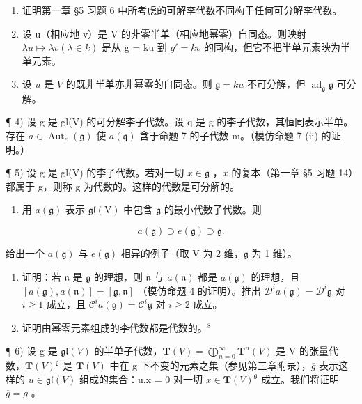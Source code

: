 
\begin{enumerate}
\def\labelenumi{\arabic{enumi})}
\item
  证明第一章 §5 习题 6 中所考虑的可解李代数不同构于任何可分解李代数。
\item
  设 u（相应地 v）是 V 的非零半单（相应地幂零）自同态。则映射 \(\lambda u \mapsto \lambda v (\lambda \in k)\) 是从 g = ku 到 \(g' = kv\) 的同构，但它不把半单元素映为半单元素。
\item
  设 \(u\) 是 \(V\) 的既非半单亦非幂零的自同态。则 \(\mathfrak{g} = ku\) 不可分解，但 \(\operatorname{ad}_{\mathfrak{g}}\mathfrak{g}\) 可分解。
\end{enumerate}

¶ 4) 设 g 是 gl(V) 的可分解李子代数。设 q 是 g 的李子代数，其恒同表示半单。存在 \(a \in \operatorname{Aut}_{e}(\mathfrak{g})\) 使 \(a(\mathfrak{q})\) 含于命题 7 的子代数 m。（模仿命题 7 (ii) 的证明。）

¶ 5) 设 g 是 gl(V) 的李子代数。若对一切 \(x \in \mathfrak{g}\) ，\(x\) 的复本（第一章 §5 习题 14）都属于 g，则称 g 为代数的。这样的代数是可分解的。

\begin{enumerate}
\def\labelenumi{\alph{enumi})}
\tightlist
\item
  用 \(a(\mathfrak{g})\) 表示 \(\mathfrak{gl}(\mathrm{V})\) 中包含 \(\mathfrak{g}\) 的最小代数子代数。则
\end{enumerate}

\[
a (\mathfrak {g}) \supset e (\mathfrak {g}) \supset \mathfrak {g}.
\]

给出一个 \(a(\mathfrak{g})\) 与 \(e(\mathfrak{g})\) 相异的例子（取 V 为 2 维，\(\mathfrak{g}\) 为 1 维）。

\begin{enumerate}
\def\labelenumi{\alph{enumi})}
\setcounter{enumi}{1}
\item
  证明：若 \(\mathfrak{n}\) 是 \(\mathfrak{g}\) 的理想，则 \(\mathfrak{n}\) 与 \(a(\mathfrak{n})\) 都是 \(a(\mathfrak{g})\) 的理想，且 \([a(\mathfrak{g}), a(\mathfrak{n})] = [\mathfrak{g}, \mathfrak{n}]\) （模仿命题 4 的证明）。推出 \(\mathcal{D}^i a(\mathfrak{g}) = \mathcal{D}^i \mathfrak{g}\) 对 \(i \geq 1\) 成立，且 \(\mathcal{C}^i a(\mathfrak{g}) = \mathcal{C}^i \mathfrak{g}\) 对 \(i \geq 2\) 成立。
\item
  证明由幂零元素组成的李代数都是代数的。\(^{8}\)
\end{enumerate}

¶ 6) 设 g 是 \(\mathfrak{gl}(V)\) 的半单子代数，\(\mathbf{T}(V) = \bigoplus_{n=0}^{\infty} \mathbf{T}^{n}(V)\) 是 V 的张量代数，\(\mathbf{T}(V)^{\mathfrak{g}}\) 是 \(\mathbf{T}(V)\) 中在 g 下不变的元素之集（参见第三章附录），\(\overline{g}\) 表示这样的 \(u \in \mathfrak{gl}(V)\) 组成的集合：u.x = 0 对一切 \(x \in \mathbf{T}(V)^{\mathfrak{g}}\) 成立。我们将证明 \(\overline{g} = g\) 。

